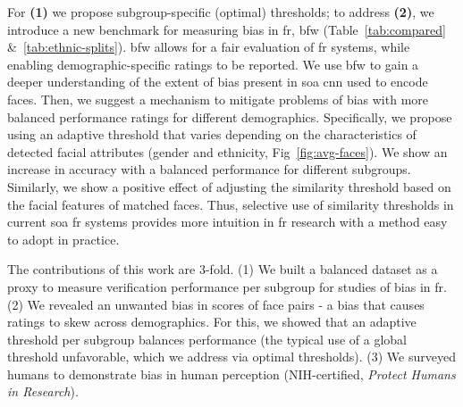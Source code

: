     For \textbf{(1)} we propose subgroup-specific (\ie optimal) thresholds; to address \textbf{(2)}, we introduce a new benchmark for measuring bias in \gls{fr}, \gls{bfw} (Table~\ref{tab:compared} \&~\ref{tab:ethnic-splits}). \gls{bfw} allows for a fair evaluation of \gls{fr} systems, while enabling demographic-specific ratings to be reported. We use \gls{bfw} to gain a deeper understanding of the extent of bias present in \gls{soa} \gls{cnn} used to encode faces. Then, we suggest a mechanism to mitigate problems of bias with more balanced performance ratings for different demographics. Specifically, we propose using an adaptive threshold that varies depending on the characteristics of detected facial attributes (\ie gender and ethnicity, Fig~\ref{fig:avg-faces}). We show an increase in accuracy with a balanced performance for different subgroups. Similarly, we show a positive effect of adjusting the similarity threshold based on the facial features of matched faces. Thus, selective use of similarity thresholds in current \gls{soa} \gls{fr} systems provides more intuition in \gls{fr} research with a method easy to adopt in practice. 
    
    
    The contributions of this work are 3-fold. (1) We built a balanced dataset as a proxy to measure verification performance per subgroup for studies of bias in \gls{fr}. (2) We revealed an unwanted bias in scores of face pairs - a bias that causes ratings to skew across demographics. For this, we showed that an adaptive threshold per subgroup balances performance (\ie the typical use of a global threshold unfavorable, which we address via optimal thresholds). (3) We surveyed humans to demonstrate bias in human perception (NIH-certified, \textit{Protect Humans in Research}).%
